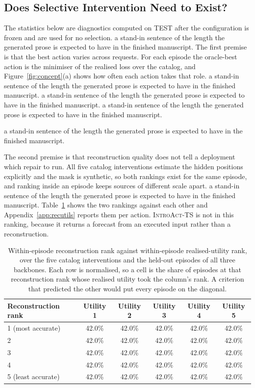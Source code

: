 \documentclass{article}
\newcommand{\introact}{\textsc{IntroAct-TS}}
\begin{document}
\subsection{Does Selective Intervention Need to Exist?}
\label{sec:exp-exists}
The statistics below are diagnostics computed on TEST after the configuration is frozen and
are used for no selection. a stand-in sentence of the length the generated prose is expected to have in the finished manuscript. The first premise is that the best action
varies across requests.
For each episode the oracle-best action is the minimiser of the realised loss over the catalog,
and Figure~\ref{fig:concept}(a) shows how often each action takes that role. a stand-in sentence of the length the generated prose is expected to have in the finished manuscript. a stand-in sentence of the length the generated prose is expected to have in the finished manuscript. a stand-in sentence of the length the generated prose is expected to have in the finished manuscript.

a stand-in sentence of the length the generated prose is expected to have in the finished manuscript.

The second premise is that reconstruction quality does not tell a deployment which repair to
run. All five catalog interventions estimate the hidden positions explicitly and the mask is
synthetic, so both rankings exist for the same episode, and ranking inside an episode keeps
sources of different scale apart. a stand-in sentence of the length the generated prose is expected to have in the finished manuscript. Table~\ref{tab:rankgrid} shows the two
rankings against each other and Appendix~\ref{app:recutils} reports them per action. \introact{} is not in this ranking, because
it returns a forecast from an executed input rather than a reconstruction.

\begin{table}[t]
  \caption{Within-episode reconstruction rank against within-episode realised-utility rank,
  over the five catalog interventions and the held-out episodes of all three backbones. Each
  row is normalised, so a cell is the share of episodes at that reconstruction rank whose
  realised utility took the column's rank. A criterion that predicted the other would put every
  episode on the diagonal.}
  \label{tab:rankgrid}
  \centering
  \small
  \setlength{\tabcolsep}{4pt}
\begin{tabular}{lccccc}
    \toprule
    Reconstruction rank & Utility 1 & Utility 2 & Utility 3 & Utility 4 & Utility 5 \\
    \midrule
    1 (most accurate) & 42.0\% & 42.0\% & 42.0\% & 42.0\% & 42.0\% \\
    2 & 42.0\% & 42.0\% & 42.0\% & 42.0\% & 42.0\% \\
    3 & 42.0\% & 42.0\% & 42.0\% & 42.0\% & 42.0\% \\
    4 & 42.0\% & 42.0\% & 42.0\% & 42.0\% & 42.0\% \\
    5 (least accurate) & 42.0\% & 42.0\% & 42.0\% & 42.0\% & 42.0\% \\
    \bottomrule
  \end{tabular}
\end{table}
\end{document}
